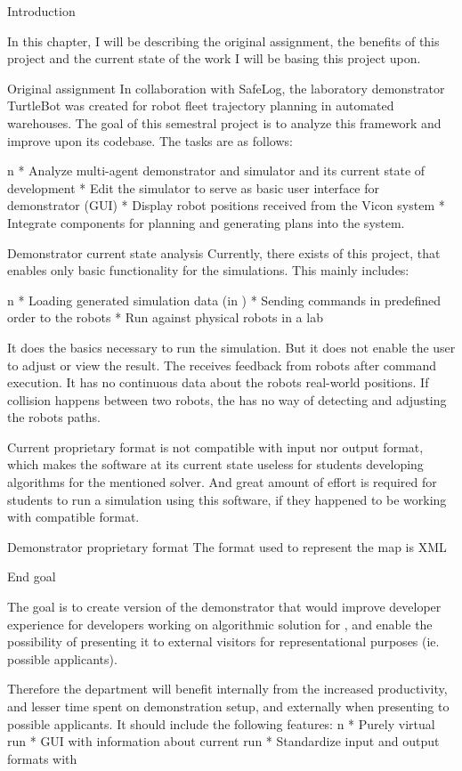 \chap Introduction


In this chapter, I will be describing the original assignment, the benefits of this project and the current state of the work I will be basing this project upon.

\sec Original assignment
In collaboration with SafeLog, the laboratory demonstrator TurtleBot was created for robot fleet trajectory planning in automated warehouses. The goal of this semestral project is to analyze this framework and improve upon its codebase. The tasks are as follows:

\begitems \style n
    * Analyze multi-agent demonstrator and simulator {\mapfIR} and its current state of development 
    * Edit the simulator to serve as basic user interface for demonstrator (GUI)
    * Display robot positions received from the Vicon system
    * Integrate components for planning and generating plans into the system.
\enditems

\sec Demonstrator current state analysis
Currently, there exists {\oldRepo} of this project, that enables only basic functionality for the simulations. This mainly includes:

\begitems \style n
    * Loading generated simulation data (in {\oldFormat})
    * Sending commands in predefined order to the robots
    * Run against physical robots in a lab
\enditems

It does the basics necessary to run the simulation. But it does not enable the user to adjust or view the result. The {\oldRepo} receives feedback from robots after command execution. It has no continuous data about the robots real-world positions. If collision happens between two robots, the {\oldRepo} has no way of detecting and adjusting the robots paths.

Current proprietary format is not compatible with {\mapfIR} input nor output format, which makes the software at its current state useless for students developing algorithms for the mentioned solver. And great amount of effort is required for students to run a simulation using this software, if they happened to be working with compatible format.

\sec Demonstrator proprietary format
The format used to represent the map is XML 

\sec End goal

The goal is to create version of the demonstrator that would improve developer experience for developers working on algorithmic solution for {\mapfIR}, and enable the possibility of presenting it to external visitors for representational purposes (ie. possible applicants).

Therefore the department will benefit internally from the increased productivity, and lesser time spent on demonstration setup, and externally when presenting to possible applicants.
It should include the following features:
\begitems \style n
    * Purely virtual run
    * GUI with information about current run
    * Standardize input and output formats with \mapfIR
\enditems




\bye
\endtt
